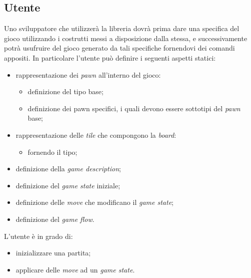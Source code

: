 \subsection{Utente}

Uno sviluppatore che utilizzerà la libreria dovrà prima dare una specifica del gioco utilizzando i costrutti messi a disposizione dalla stessa, e successivamente potrà usufruire del gioco generato da tali specifiche fornendovi dei comandi appositi.
%
In particolare l'utente può definire i seguenti aspetti statici:
%
\begin{itemize}
    \item rappresentazione dei \textit{pawn} all'interno del gioco:
    \begin{itemize}
        \item definizione del tipo base;
        \item definizione dei pawn specifici, i quali devono essere sottotipi del \textit{pawn} base;
    \end{itemize}
    \item rappresentazione delle \textit{tile} che compongono la \textit{board}:
    \begin{itemize}
        \item fornendo il tipo;
    \end{itemize}
    \item definizione della \textit{game description};
    \item definizione del \textit{game state} iniziale;
    \item definizione delle \textit{move} che modificano il \textit{game state};
    \item definizione del \textit{game flow}.
\end{itemize}
%
L'utente è in grado di:
%
\begin{itemize}
    \item inizializzare una partita;
    \item applicare delle \textit{move} ad un \textit{game state}.
\end{itemize}


